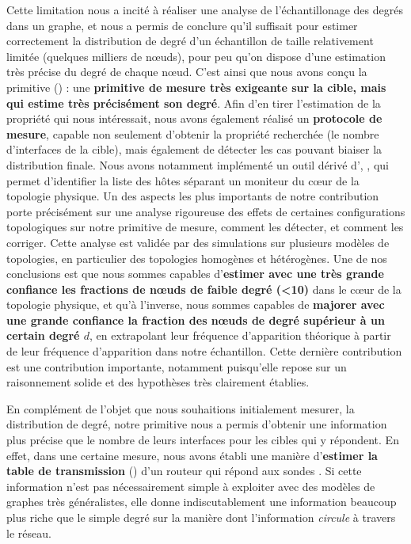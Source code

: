 Cette limitation nous a incité à réaliser une analyse de l'échantillonage des
degrés dans un graphe, et nous a permis de conclure qu'il suffisait pour estimer
correctement la distribution de degré d'un échantillon de taille relativement
limitée (quelques milliers de n\oe{}uds), pour peu qu'on dispose d'une
estimation très précise du degré de chaque n\oe{}ud. C'est ainsi que nous avons
conçu la primitive \udpping () : une {\bf primitive de mesure
très exigeante sur la cible, mais qui estime très précisément son degré}.
Afin d'en tirer l'estimation de la propriété qui nous intéressait, nous avons
également réalisé un {\bf protocole de mesure}, capable non seulement d'obtenir
la propriété recherchée (le nombre d'interfaces de la cible), mais également de
détecter les cas pouvant biaiser la distribution finale. Nous avons
notamment implémenté un outil dérivé d'\udpping, \udpexplore, qui permet
d'identifier la liste des hôtes séparant un moniteur du c\oe{}ur de la topologie
physique. Un des aspects les plus importants de notre contribution porte
précisément sur une analyse rigoureuse des effets de certaines configurations
topologiques sur notre primitive de mesure, comment les détecter, et comment les
corriger. Cette analyse est validée par des simulations sur plusieurs modèles de
topologies, en particulier des topologies homogènes et hétérogènes. Une de nos
conclusions est que nous sommes capables d'{\bf estimer avec une très grande
confiance les fractions de n\oe{}uds de faible degré (<10)} dans le c\oe{}ur de
la topologie physique, et qu'à l'inverse, nous sommes capables de {\bf majorer
avec une grande confiance la fraction des n\oe{}uds de degré supérieur à un
certain degré $d$}, en extrapolant leur fréquence d'apparition théorique à
partir de leur fréquence d'apparition dans notre échantillon. Cette dernière
contribution est une contribution importante, notamment puisqu'elle repose sur
un raisonnement solide et des hypothèses très clairement établies.

En complément de l'objet que nous souhaitions initialement mesurer, la
distribution de degré, notre primitive \udpping nous a permis d'obtenir une
information plus précise que le nombre de leurs interfaces pour les cibles qui y
répondent. En effet, dans une certaine mesure, nous avons établi une manière
d'{\bf estimer la table de transmission} () d'un routeur qui
répond aux sondes \udpping. Si cette information n'est pas nécessairement simple
à exploiter avec des modèles de graphes très généralistes, elle donne
indiscutablement une information beaucoup plus riche que le simple degré sur la
manière dont l'information {\em circule} à travers le réseau.

